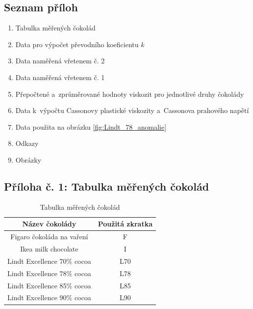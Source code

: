 \documentclass[12pt]{article}
\begin{document}
\subsection*{Seznam příloh}%

\begin{enumerate}[noitemsep, topsep = 0pt]
    \item Tabulka měřených čokolád
    \item Data pro výpočet převodního koeficientu $k$
    \item Data naměřená vřetenem č. 2
    \item Data naměřená vřetenem č. 1
    \item Přepočtené a~zprůměrované hodnoty viskozit pro jednotlivé druhy čokolády
    \item Data k~výpočtu Cassonovy plastické viskozity a~Cassonova prahového napětí
    \item Data použita na obrázku \ref{fig:Lindt_78_anomalie}
    \item Odkazy
    \item Obrázky
\end{enumerate}

\newpage%
\subsection*{Příloha č. 1: Tabulka měřených čokolád}%

\begin{table}[!h]
    \centering
    \begin{NiceTabular}{|c|c|}
        \hline
        Název čokolády & Použitá zkratka \\ \hline\hline
        Figaro čokoláda na vaření & F \\ \hline
        Ikea milk chocolate & I \\ \hline
        Lindt Excellence 70\% cocoa & L70 \\ \hline
        Lindt Excellence 78\% cocoa & L78 \\ \hline
        Lindt Excellence 85\% cocoa & L85 \\ \hline
        Lindt Excellence 90\% cocoa & L90 \\      
        \hline
    \end{NiceTabular}
    \caption{Tabulka měřených čokolád}
    \label{tab:cokolady}
\end{table} %
\end{document}
